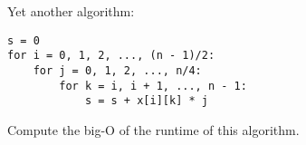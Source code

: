 Yet another algorithm:
\begin{Verbatim}[frame=single, fontsize=\small]
s = 0
for i = 0, 1, 2, ..., (n - 1)/2:
    for j = 0, 1, 2, ..., n/4:
        for k = i, i + 1, ..., n - 1:
            s = s + x[i][k] * j
\end{Verbatim}
Compute the big-O of the runtime of this algorithm.

